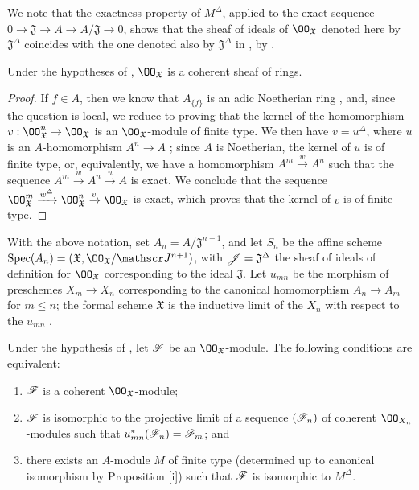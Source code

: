We note that the exactness property of $M^\Delta$, applied to the exact sequence $0\to\mathfrak{J}\to A\to A/\mathfrak{J}\to 0$, shows that the sheaf of ideals of $\OO_\mathfrak{X}$ denoted here by $\mathfrak{J}^\Delta$ coincides with the one denoted also by $\mathfrak{J}^\Delta$ in , by .

\begin{prop}[10.10.3]
\label{1.10.10.3}
Under the hypotheses of , $\OO_\mathfrak{X}$ is a coherent sheaf of rings.
\end{prop}

\begin{proof}
\label{proof-1.10.10.3}
If $f\in A$, then we know that $A_{\{f\}}$ is an adic Noetherian ring , and, since the question is local, we reduce  to proving that the kernel of the homomorphism $v:\OO_\mathfrak{X}^n\to\OO_\mathfrak{X}$ is an $\OO_\mathfrak{X}$-module of finite type.
We then have $v=u^\Delta$, where $u$ is an $A$-homomorphism $A^n\to A$ ; since $A$ is Noetherian, the kernel of $u$ is of finite type, or, equivalently, we have a homomorphism $A^m\xrightarrow{w}A^n$ such that the sequence $A^m\xrightarrow{w}A^n\xrightarrow{u}A$ is exact.
We conclude  that the sequence $\OO_\mathfrak{X}^m\xrightarrow{w^\Delta}\OO_\mathfrak{X}^n\xrightarrow{v}\OO_\mathfrak{X}$ is exact, which proves that the kernel of $v$ is of finite type.
\end{proof}

\begin{env}[10.10.4]
\label{1.10.10.4}
With the above notation, set $A_n=A/\mathfrak{J}^{n+1}$, and let $S_n$ be the affine scheme $\Spec(A_n)=(\mathfrak{X},\OO_\mathfrak{X}/\sh{J}^{n+1})$, with $\mathscr{J}=\mathfrak{J}^\Delta$ the sheaf of ideals of definition for $\OO_\mathfrak{X}$ corresponding to the ideal $\mathfrak{J}$.
Let $u_{mn}$ be the morphism of preschemes $X_m\to X_n$ corresponding to the canonical homomorphism $A_n\to A_m$ for $m\leq n$; the formal scheme $\mathfrak{X}$ is the inductive limit of the $X_n$ with respect to the $u_{mn}$ .
\end{env}

\begin{prop}[10.10.5]
\label{1.10.10.5}
Under the hypothesis of , let $\mathscr{F}$ be an $\OO_\mathfrak{X}$-module.
The following conditions are equivalent:
\begin{enumerate}[label=\emph{(\alph*)}]
  \item $\mathscr{F}$ is a coherent $\OO_\mathfrak{X}$-module;
  \item $\mathscr{F}$ is isomorphic to the projective limit  of a sequence $(\mathscr{F}_n)$ of coherent $\OO_{X_n}$-modules such that $u_{mn}^*(\mathscr{F}_n)=\mathscr{F}_m$; and
  \item there exists an $A$-module $M$ of finite type (determined up to canonical isomorphism by Proposition [i]) such that $\mathscr{F}$ is isomorphic to $M^\Delta$.
\end{enumerate}
\end{prop}

